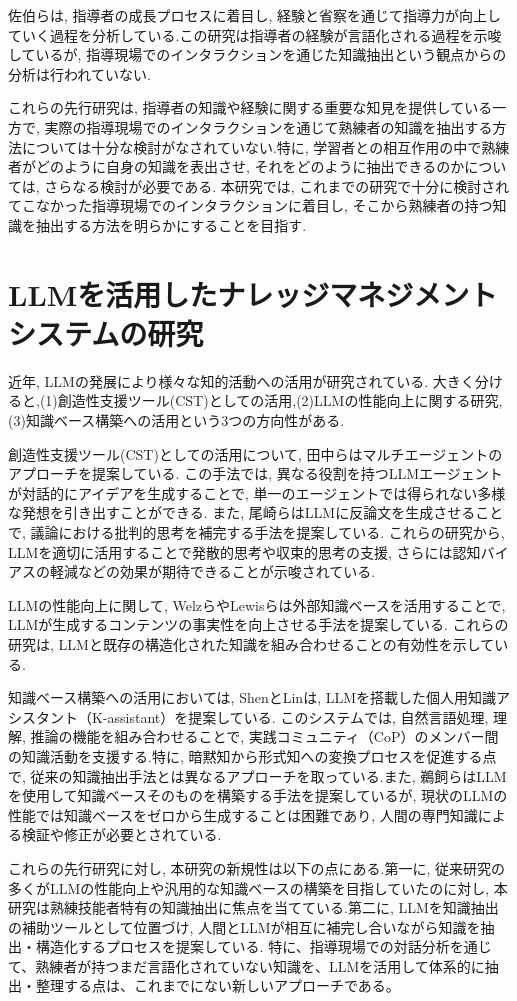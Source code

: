 佐伯ら\cite{Saeki2017}は, 指導者の成長プロセスに着目し, 経験と省察を通じて指導力が向上していく過程を分析している.この研究は指導者の経験が言語化される過程を示唆しているが, 指導現場でのインタラクションを通じた知識抽出という観点からの分析は行われていない.

これらの先行研究は, 指導者の知識や経験に関する重要な知見を提供している一方で, 実際の指導現場でのインタラクションを通じて熟練者の知識を抽出する方法については十分な検討がなされていない.特に, 学習者との相互作用の中で熟練者がどのように自身の知識を表出させ, それをどのように抽出できるのかについては, さらなる検討が必要である.
本研究では, これまでの研究で十分に検討されてこなかった指導現場でのインタラクションに着目し, そこから熟練者の持つ知識を抽出する方法を明らかにすることを目指す.\\



\section{LLMを活用したナレッジマネジメントシステムの研究}
近年, LLMの発展により様々な知的活動への活用が研究されている. 大きく分けると,(1)創造性支援ツール(CST)としての活用,(2)LLMの性能向上に関する研究, (3)知識ベース構築への活用という3つの方向性がある.

創造性支援ツール(CST)としての活用について, 田中らはマルチエージェントのアプローチを提案している\cite{Tanaka2024}. この手法では, 異なる役割を持つLLMエージェントが対話的にアイデアを生成することで, 単一のエージェントでは得られない多様な発想を引き出すことができる. また, 尾崎らはLLMに反論文を生成させることで, 議論における批判的思考を補完する手法を提案している\cite{Ozaki2024}. これらの研究から, LLMを適切に活用することで発散的思考や収束的思考の支援, さらには認知バイアスの軽減などの効果が期待できることが示唆されている.

LLMの性能向上に関して, WelzらやLewisらは外部知識ベースを活用することで, LLMが生成するコンテンツの事実性を向上させる手法を提案している\cite{Welz2024, Lewis2020}. これらの研究は, LLMと既存の構造化された知識を組み合わせることの有効性を示している.

知識ベース構築への活用においては, ShenとLin\cite{Shen2024}は, LLMを搭載した個人用知識アシスタント（K-assistant）を提案している. このシステムでは, 自然言語処理, 理解, 推論の機能を組み合わせることで, 実践コミュニティ（CoP）のメンバー間の知識活動を支援する.特に, 暗黙知から形式知への変換プロセスを促進する点で, 従来の知識抽出手法とは異なるアプローチを取っている.また, 鵜飼らはLLMを使用して知識ベースそのものを構築する手法を提案している\cite{Ukai2023}が, 現状のLLMの性能では知識ベースをゼロから生成することは困難であり, 人間の専門知識による検証や修正が必要とされている.

これらの先行研究に対し, 本研究の新規性は以下の点にある.第一に, 従来研究の多くがLLMの性能向上や汎用的な知識ベースの構築を目指していたのに対し, 本研究は熟練技能者特有の知識抽出に焦点を当てている.第二に, LLMを知識抽出の補助ツールとして位置づけ, 人間とLLMが相互に補完し合いながら知識を抽出・構造化するプロセスを提案している. 特に、指導現場での対話分析を通じて、熟練者が持つまだ言語化されていない知識を、LLMを活用して体系的に抽出・整理する点は、これまでにない新しいアプローチである。
